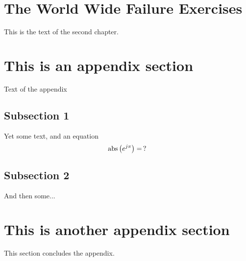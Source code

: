\section{The World Wide Failure Exercises}
This is the text of the second chapter. \cite{*}

\appendix
\section{This is an appendix section}
Text of the appendix

\subsection{Subsection 1}
Yet some text, and an equation
\begin{equation}
    \textnormal{abs}\left(e^{j\pi}\right)=\,?
\end{equation}

\subsection{Subsection 2}
And then some...

\section{This is another appendix section}
This section concludes the appendix.
